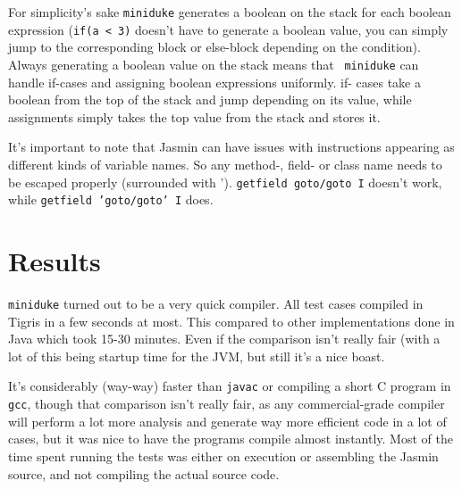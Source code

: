 \documentclass[a4paper,11pt]{article}
\begin{document}
For simplicity's sake {\tt miniduke} generates a boolean on the stack for each
boolean expression ({\tt if(a < 3)} doesn't have to generate a boolean value,
you can simply jump to the corresponding block or else-block depending on the
condition). Always generating a boolean value on the stack means that {\tt
miniduke} can handle if-cases and assigning boolean expressions uniformly. if-
cases take a boolean from the top of the stack and jump depending on its
value, while assignments simply takes the top value from the stack and stores
it.

It's important to note that Jasmin can have issues with instructions appearing
as different kinds of variable names. So any method-, field- or class name
needs to be escaped properly (surrounded with '). {\tt getfield goto/goto I}
doesn't work, while {\tt getfield 'goto/goto' I} does.

\section*{Results}

{\tt miniduke} turned out to be a very quick compiler. All test cases compiled
in Tigris in a few seconds at most. This compared to other implementations done
in Java which took 15-30 minutes. Even if the comparison isn't really fair
(with a lot of this being startup time for the JVM, but still it's a nice
boast.

It's considerably (way-way) faster than {\tt javac} or compiling a short C
program in {\tt gcc}, though that comparison isn't really fair, as any
commercial-grade compiler will perform a lot more analysis and generate way
more efficient code in a lot of cases, but it was nice to have the programs
compile almost instantly. Most of the time spent running the tests was either
on execution or assembling the Jasmin source, and not compiling the actual
source code.
\end{document}
